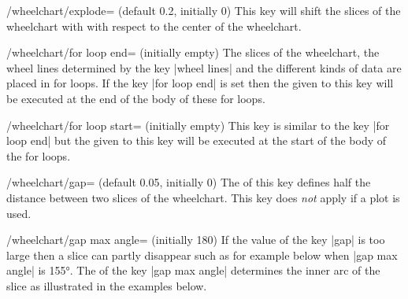 \documentclass[a4paper,english,dvipsnames]{ltxdoc}
\begin{document}
\begin{key}{/wheelchart/explode= (default 0.2, initially 0)}
This key will shift the slices of the wheelchart with  with respect to the center of the wheelchart.
\end{key}
\begin{key}{/wheelchart/for loop end= (initially \normalfont empty)}
The slices of the wheelchart, the wheel lines determined by the key |wheel lines| and the different kinds of data are placed in for loops. If the key |for loop end| is set then the  given to this key will be executed at the end of the body of these for loops.
\end{key}
\begin{key}{/wheelchart/for loop start= (initially \normalfont empty)}
This key is similar to the key |for loop end| but the  given to this key will be executed at the start of the body of the for loops.
\end{key}
\begin{key}{/wheelchart/gap= (default 0.05, initially 0)}
The  of this key defines half the distance between two slices of the wheelchart. This key does \emph{not} apply if a plot is used.
\end{key}
\begin{key}{/wheelchart/gap max angle= (initially 180)}
If the value of the key |gap| is too large then a slice can partly disappear such as for example below when |gap max angle| is \ang{155}. The  of the key |gap max angle| determines the inner arc of the slice as illustrated in the examples below.
\begin{codeexample}[preamble={\usepackage{siunitx}}]
\end{codeexample}
\end{key}
\end{document}
